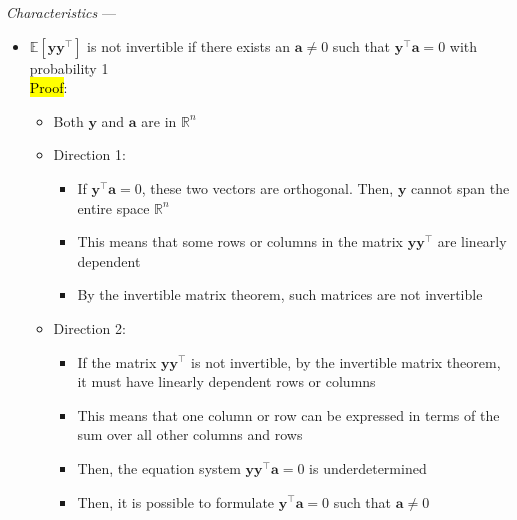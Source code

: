 \emph{Characteristics} --- 
\begin{itemize}
    \item $\mathbb{E}[ \boldsymbol{y} \boldsymbol{y}^\intercal ]$ is not invertible if there exists an $\boldsymbol{a} \neq 0$ such that $\boldsymbol{y}^\intercal\boldsymbol{a} = 0$ with probability 1 \\
    \hl{Proof}:
    \begin{itemize}
        \item Both $\boldsymbol{y}$ and $\boldsymbol{a}$ are in $\mathbb{R}^n$
        \item Direction 1:
            \begin{itemize}
            \item If $\boldsymbol{y}^\intercal\boldsymbol{a} = 0$, these two vectors are orthogonal. Then, $\boldsymbol{y}$ cannot span the entire space $\mathbb{R}^n$
            \item This means that some rows or columns in the matrix $\boldsymbol{y}\boldsymbol{y}^\intercal$ are linearly dependent
            \item By the invertible matrix theorem, such matrices are not invertible
        \end{itemize}
        \item Direction 2:
        \begin{itemize}
            \item If the matrix $\boldsymbol{y}\boldsymbol{y}^\intercal$ is not invertible, by the invertible matrix theorem, it must have linearly dependent rows or columns
            \item This means that one column or row can be expressed in terms of the sum over all other columns and rows
            \item Then, the equation system $\boldsymbol{y}\boldsymbol{y}^\intercal\boldsymbol{a} = 0$ is underdetermined
            \item Then, it is possible to formulate $\boldsymbol{y}^\intercal\boldsymbol{a} = 0$ such that $\boldsymbol{a} \neq 0$ 
        \end{itemize}
    \end{itemize}
\end{itemize}